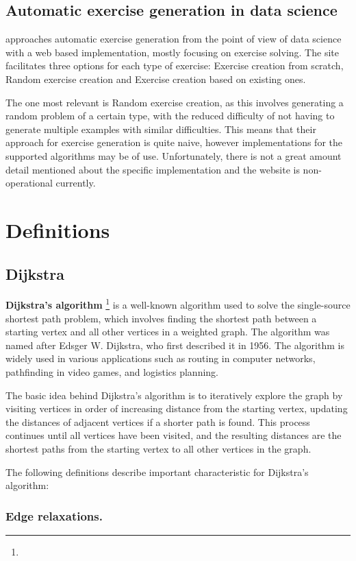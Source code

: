 \documentclass{l4proj}
\begin{document}
\subsection{Automatic exercise generation in data science}
\citet{Kot19} approaches automatic exercise generation from the point of view of data science with a web based implementation, mostly focusing on exercise solving. The site facilitates three options for each type of exercise: Exercise creation from scratch, Random exercise creation and Exercise creation based on existing ones. 

The one most relevant is Random exercise creation, as this involves generating a random problem of a certain type, with the reduced difficulty of not having to generate multiple examples with similar difficulties. This means that their approach for exercise generation is quite naive, however implementations for the supported algorithms may be of use. Unfortunately, there is not a great amount detail mentioned about the specific implementation and the website is non-operational currently.

\section{Definitions}
\subsection{Dijkstra}

\textbf{Dijkstra's algorithm} \footnote{} is a well-known algorithm used to solve the single-source shortest path problem, which involves finding the shortest path between a starting vertex and all other vertices in a weighted graph. The algorithm was named after Edsger W. Dijkstra, who first described it in 1956. The algorithm is widely used in various applications such as routing in computer networks, pathfinding in video games, and logistics planning.

The basic idea behind Dijkstra's algorithm is to iteratively explore the graph by visiting vertices in order of increasing distance from the starting vertex, updating the distances of adjacent vertices if a shorter path is found. This process continues until all vertices have been visited, and the resulting distances are the shortest paths from the starting vertex to all other vertices in the graph.

The following definitions describe important characteristic for Dijkstra's algorithm:
\subsubsection{Edge relaxations.}
\end{document}
